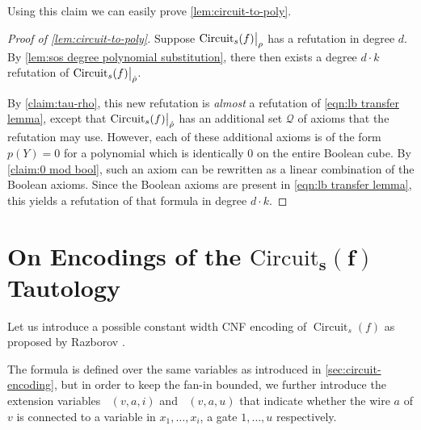 \documentclass[10pt,a4paper]{article}
\theoremstyle{plain}
\theoremstyle{remark}
\theoremstyle{definition}
\newcommand\restrict[2]{{%
  \left.\kern-\nulldelimiterspace %
  #1 %
  \vphantom{\big|} %
  \right|_{#2} %
  }}
\newcommand{\calQ}{\mathcal{Q}}
\newcommand{\vars}[1]{\mathsf{#1}}
\DeclareMathOperator{\circuit}{Circuit}
\DeclareMathOperator{\isvarless}{\vars{IsInput^{\le}}}
\DeclareMathOperator{\isgateless}{\vars{IsGate^{\le}}}
\begin{document}
Using this claim we can easily prove \cref{lem:circuit-to-poly}.

\begin{proof}[Proof of \cref{lem:circuit-to-poly}]
  Suppose $\restrict{\circuit_s(f)}{\rho}$ has a refutation in degree
  $d$.  By \cref{lem:sos degree polynomial substitution}, there then
  exists a degree $d \cdot k$ refutation of
  $\restrict{\circuit_s(f)}{\hat\rho}$.

  By \cref{claim:tau-rho}, this new refutation is \emph{almost} a
  refutation of \eqref{eqn:lb transfer lemma}, except that
  $\restrict{\circuit_s(f)}{\hat\rho}$ has an additional set $\calQ$
  of axioms that the refutation may use.  However, each of these
  additional axioms is of the form $p(Y) = 0$ for a polynomial which
  is identically $0$ on the entire Boolean cube.  By \cref{claim:0 mod
    bool}, such an axiom can be rewritten as a linear combination of
  the Boolean axioms.  Since the Boolean axioms are present in
  \eqref{eqn:lb transfer lemma}, this yields a refutation of that
  formula in degree $d \cdot k$.
\end{proof}



\section[On Encodings of the $\circuit_s(f)$ Tautology]{On Encodings
  of the $\bm{\mathrm{Circuit}_s(f)}$ Tautology}
\label{sec:encoding}

Let us introduce a possible constant width CNF encoding of
$\circuit_s(f)$ as proposed by Razborov \cite{Razborov98}.

The formula is defined over the same variables as introduced in
\cref{sec:circuit-encoding}, but in order to keep the fan-in bounded,
we further introduce the extension variables $\isvarless(v, a, i)$ and
$\isgateless(v, a, u)$ that indicate whether the wire $a$ of $v$ is
connected to a variable in $x_1, \ldots, x_i$, a gate $1, \ldots, u$
respectively.
\end{document}
